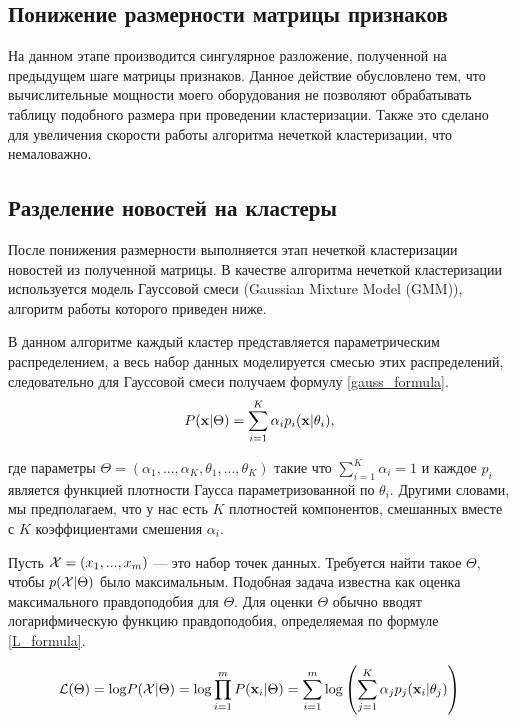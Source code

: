 \subsection{Понижение размерности матрицы признаков}

На данном этапе производится сингулярное разложение, полученной на предыдущем шаге матрицы признаков. Данное действие обусловлено тем, что вычислительные мощности моего оборудования не позволяют обрабатывать таблицу подобного размера при проведении кластеризации. Также это сделано для увеличения скорости работы алгоритма нечеткой кластеризации, что немаловажно.


\subsection{Разделение новостей на кластеры}

После понижения размерности выполняется этап нечеткой кластеризации новостей из полученной матрицы. В качестве алгоритма нечеткой кластеризации используется модель Гауссовой смеси (Gaussian Mixture Model (GMM)), алгоритм работы которого приведен ниже.

В данном алгоритме каждый кластер представляется параметрическим распределением, а весь набор данных моделируется смесью этих распределений, следовательно для Гауссовой смеси получаем формулу \ref{gauss_formula}.
\begin{equation}
\label{gauss_formula}
P({\bf x}\vert \Theta)=\sum_{i=1}^K \alpha_i p_i({\bf x}\vert \theta_i),
\end{equation}

где параметры $\Theta = (\alpha_1,...,\alpha_K, \theta_1,...,\theta_K)$ такие что $\sum_{i=1}^{K}\alpha_i = 1$ и каждое $p_i$ является функцией плотности Гаусса параметризованной по $\theta_i$. Другими словами, мы предполагаем, что у нас есть $K$ плотностей компонентов, смешанных вместе с $K$ коэффициентами смешения $\alpha_i$.

Пусть ${\cal X} = (x_1,...,x_m)$ --- это набор точек данных. Требуется найти такое $\Theta$, чтобы $p({\cal X}\vert\Theta)$ было максимальным. Подобная задача известна как оценка максимального правдоподобия для $\Theta$. Для оценки $\Theta$ обычно вводят логарифмическую функцию правдоподобия, определяемая по формуле \ref{L_formula}.

\begin{equation}
\label{L_formula}
{\cal L}(\Theta)={\rm log} P({\cal X}\vert \Theta)={\rm log} \prod_{i=1}^m P({\bf x}_i \vert \Theta) =\sum_{i=1}^m {\rm log} \left( \sum_{j=1}^K \alpha_j p_j({\bf x}_i\vert \theta_j)\right)
\end{equation}

